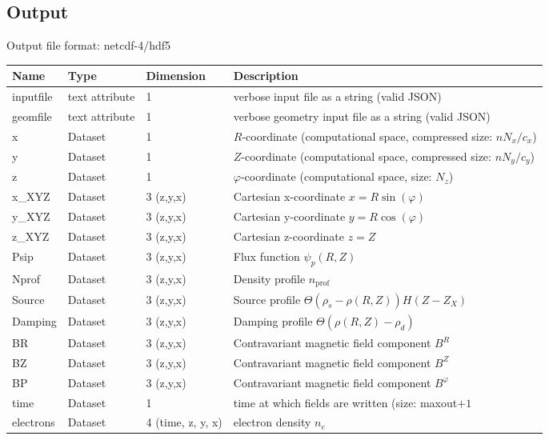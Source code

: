 \subsection{Output}
Output file format: netcdf-4/hdf5
%
\begin{longtable}{lll>{\RaggedRight}p{7cm}}
\toprule
\rowcolor{gray!50}\textbf{Name} &  \textbf{Type} & \textbf{Dimension} & \textbf{Description}  \\ \midrule
inputfile  &     text attribute & 1 & verbose input file as a string (valid JSON) \\
geomfile   &     text attribute & 1 & verbose geometry input file as a string (valid JSON) \\
x                & Dataset & 1 & $R$-coordinate (computational space, compressed size: $nN_x/c_x$)\\
y                & Dataset & 1 & $Z$-coordinate (computational space, compressed size: $nN_y/c_y$)\\
z                & Dataset & 1 & $\varphi$-coordinate (computational space, size: $N_z$) \\
x\_XYZ           & Dataset & 3 (z,y,x) & Cartesian x-coordinate $x=R\sin(\varphi)$ \\
y\_XYZ           & Dataset & 3 (z,y,x) & Cartesian y-coordinate $y=R\cos(\varphi)$\\
z\_XYZ           & Dataset & 3 (z,y,x) & Cartesian z-coordinate $z=Z$ \\
Psip             & Dataset & 3 (z,y,x) & Flux function $\psi_p(R,Z)$ \\
Nprof            & Dataset & 3 (z,y,x) & Density profile $n_\text{prof}$ \\
Source           & Dataset & 3 (z,y,x) & Source  profile $\Theta(\rho_{s} - \rho(R,Z)) H(Z-Z_X)$\\
Damping          & Dataset & 3 (z,y,x) & Damping  profile $\Theta(\rho(R,Z) - \rho_{d} )$\\
BR               & Dataset & 3 (z,y,x) & Contravariant magnetic field component $B^R$ \\
BZ               & Dataset & 3 (z,y,x) & Contravariant magnetic field component $B^Z$ \\
BP               & Dataset & 3 (z,y,x) & Contravariant magnetic field component $B^\varphi$ \\
time             & Dataset & 1 & time at which fields are written (size: maxout$+1$ \\
electrons        & Dataset & 4 (time, z, y, x) & electron density $n_e$ \\

\end{longtable}
